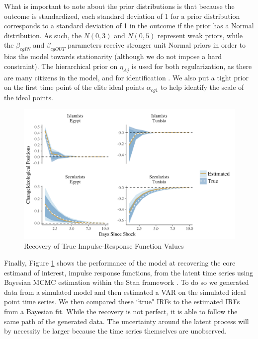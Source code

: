 \documentclass[12pt]{article}
\begin{document}
What is important to note about the prior distributions is that because the outcome is standardized, each standard deviation of 1 for a prior distribution corresponds to a standard deviation of 1 in the outcome if the prior has a Normal distribution. As such, the $N(0,3)$ and $N(0,5)$ represent weak priors, while the $\beta_{cgIN}$ and $\beta_{cgOUT}$ parameters receive stronger unit Normal priors in order to bias the model towards stationarity (although we do not impose a hard constraint). The hierarchical prior on $\eta_{Aj}$ is used for both regularization, as there are many citizens in the model, and for identification \parencite{gelman2005}. We also put a tight prior on the first time point of the elite ideal points $\alpha_{cg1}$ to help identify the scale of the ideal points.


\begin{figure}[!h]
	\caption{Recovery of True Impulse-Response Function Values}\label{irf_simulation_panels}
	\centering
	\includegraphics[width=.9\linewidth]{irf_simulation_panels}
\end{figure}

Finally, Figure \ref{irf_simulation_panels} shows the performance of the model at recovering the core estimand of interest, impulse response functions, from the latent time series using Bayesian MCMC estimation within the Stan framework \parencite{carpenter2017}. To do so we generated data from a simulated model and then estimated a VAR on the simulated ideal point time series. We then compared these ``true" IRFs to the estimated IRFs from a Bayesian fit. While the recovery is not perfect, it is able to follow the same path of the generated data. The uncertainty around the latent process will by necessity be larger because the time series themselves are unobserved.

\printbibliography
\end{document}
